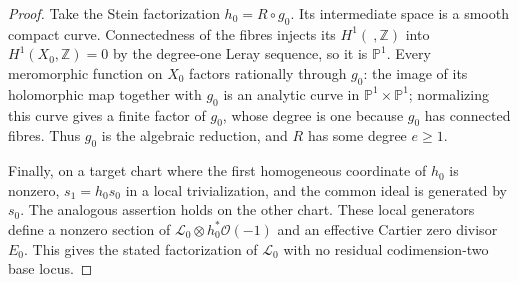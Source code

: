 \begin{proof}
Take the Stein factorization $h_0=R\circ g_0$.  Its intermediate
space is a smooth compact curve.  Connectedness of the fibres
injects its $H^1(\ ,\mathbb Z)$ into $H^1(X_0,\mathbb Z)=0$
by the degree-one Leray sequence, so it is $\mathbb P^1$.
Every meromorphic function on $X_0$ factors rationally through
$g_0$: the image of its holomorphic map together with $g_0$
is an analytic curve in $\mathbb P^1\times\mathbb P^1$;
normalizing this curve gives a finite factor of $g_0$, whose
degree is one because $g_0$ has connected fibres.  Thus $g_0$
is the algebraic reduction, and $R$ has some degree $e\ge1$.

Finally, on a target chart where the first homogeneous
coordinate of $h_0$ is nonzero, $s_1=h_0s_0$ in a local
trivialization, and the common ideal is generated by $s_0$.
The analogous assertion holds on the other chart.  These local
generators define a nonzero section of
$\mathcal L_0\otimes h_0^*\mathcal O(-1)$ and an effective
Cartier zero divisor $E_0$.  This gives the stated factorization
of $\mathcal L_0$ with no residual codimension-two base locus.
\end{proof}

